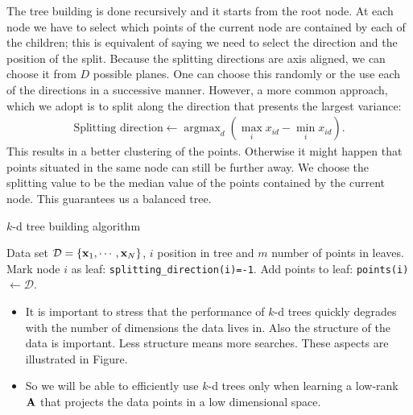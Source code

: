 The tree building is done recursively and it starts from the root node. At each node we have to select which points of the current node are contained by each of the children; this is equivalent of saying we need to select the direction and the position of the split. Because the splitting directions are axis aligned, we can choose it from $D$ possible planes. One can choose this randomly or the use each of the directions in a successive manner. However, a more common approach, which we adopt is to split along the direction that presents the largest variance: 
\begin{align}
	\text{Splitting direction} \leftarrow \operatorname{argmax}_{d} (\max_ix_{id} - \min_ix_{id}).
	\label{eq:splitting-direction}
\end{align}
This results in a better clustering of the points. Otherwise it might happen that points situated in the same node can still be further away. We choose the splitting value to be the median value of the points contained by the current node. This guarantees us a balanced tree.

	\begin{algorithm} 
		\caption{$k$-d tree building algorithm} 
		\label{alg:kd-tree-build}  
		\begin{algorithmic}                    %
			\REQUIRE Data set $\mathcal{D}=\{\mathbf{x}_1,\cdots,\mathbf{x}_N\}$, $i$ position in tree and $m$ number of points in leaves.
				\STATE Mark node $i$ as leaf: \texttt{splitting\_direction(i)=-1}.
				\STATE Add points to leaf: \texttt{points(i)}$\leftarrow \mathcal{D}$.
				\RETURN
			\ENDIF
		\end{algorithmic}
	\end{algorithm}
	
	\begin{itemize}
		\item It is important to stress that the performance of $k$-d trees quickly degrades with the number of dimensions the data lives in. Also the structure of the data is important. Less structure means more searches. These aspects are illustrated in Figure. 
		\item So we will be able to efficiently use $k$-d trees only when learning a low-rank $\mathbf{A}$ that projects the data points in a low dimensional space.
	\end{itemize}
	
